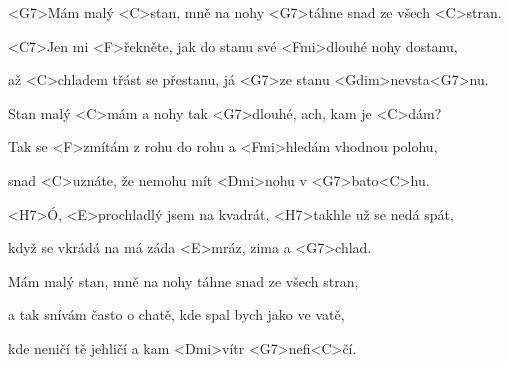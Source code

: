 

\zs
<G7>Mám malý <C>stan, mně na nohy <G7>táhne snad ze všech <C>stran.

<C7>Jen mi <F>řekněte, jak do stanu své <Fmi>dlouhé nohy dostanu,

až <C>chladem třást se přestanu, já <G7>ze stanu <Gdim>nevsta<G7>nu.

Stan malý <C>mám a nohy tak <G7>dlouhé, ach, kam je <C>dám?

Tak se <F>zmítám z rohu do rohu a <Fmi>hledám vhodnou polohu,

snad <C>uznáte, že nemohu mít <Dmi>nohu v <G7>bato<C>hu.
\ks

\zr
<H7>Ó, <E>prochladlý jsem na kvadrát, <H7>takhle už se nedá spát,

když se vkrádá na má záda <E>mráz, zima a <G7>chlad.
\kr

\zs
Mám malý stan, mně na nohy táhne snad ze všech stran,

a tak snívám často o chatě, kde spal bych jako ve vatě,

kde neničí tě jehličí a kam <Dmi>vítr <G7>nefi<C>čí.
\ks

\kp
